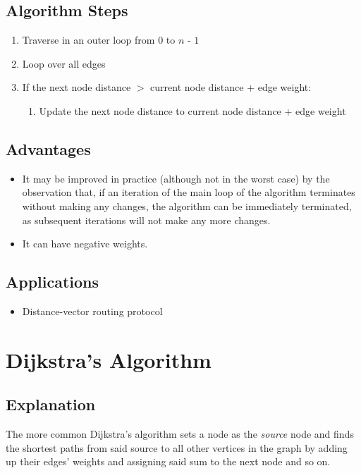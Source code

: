 \documentclass[]{article}
\begin{document}
	\subsection{Algorithm Steps}
	\begin{enumerate}
		\item Traverse in an outer loop from 0 to $\textit{n - 1}$
		\item Loop over all edges
		\item If the next node distance $>$ current node distance + edge weight:
		\begin{enumerate}
			\item Update the next node distance to current node distance + edge weight
		\end{enumerate}
	\end{enumerate}

	\subsection{Advantages}
	\begin{itemize}
		\item It may be improved in practice (although not in the worst case) by the observation that, if an iteration of the main loop of the algorithm terminates without making any changes, the algorithm can be immediately terminated, as subsequent iterations will not make any more changes. 
		\item It can have negative weights.
	\end{itemize}
	
	\subsection{Applications}
	\begin{itemize}
		\item  Distance-vector routing protocol
	\end{itemize}


\section{Dijkstra's Algorithm}
	\subsection{Explanation}
	\par The more common Dijkstra's algorithm sets a node as the \textit{source} node and finds the shortest paths from said source to all other vertices in the graph by adding up their edges' weights and assigning said sum to the next node and so on\cite{ShortestPathAlgorithms}.
	
\end{document}
